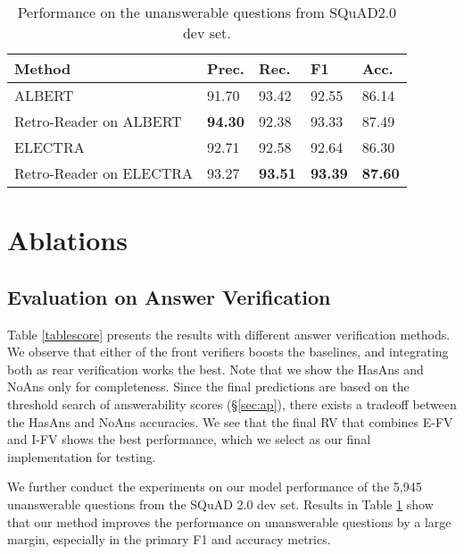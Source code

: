 \documentclass[letterpaper]{article} \usepackage{aaai21}  \usepackage{times}  \usepackage{helvet} \usepackage{courier}  \usepackage[hyphens]{url}  \usepackage{graphicx}
\begin{document}
\begin{table}
	\begin{center}
\setlength{\tabcolsep}{3.5pt}
		{
			\begin{tabular}{lllll}
				\toprule
				\textbf{Method}	& \textbf{Prec.} & \textbf{Rec.} 	& \textbf{F1} & \textbf{Acc.} \\
				\midrule
				ALBERT & 91.70 & 93.42 & 92.55 & 86.14  \\
				Retro-Reader on ALBERT & \textbf{94.30} & 92.38 & 93.33 & 87.49 \\
                ELECTRA & 92.71 & 92.58 & 92.64 & 86.30 \\
                Retro-Reader on ELECTRA & 93.27 & \textbf{93.51} & \textbf{93.39} & \textbf{87.60} \\
				\bottomrule
			\end{tabular}
		}
	\end{center}
	\caption{\label{tab:unans} Performance on the unanswerable questions from SQuAD2.0 dev set.}
\end{table}

\section{Ablations}

\subsection{Evaluation on Answer Verification}
Table \ref{tablescore} presents the results with different answer verification methods. We observe that either of the front verifiers boosts the baselines, and integrating both as rear verification works the best. Note that we show the HasAns and NoAns only for completeness. Since the final predictions are based on the threshold search of answerability scores (\S\ref{sec:ap}), there exists a tradeoff between the HasAns and NoAns accuracies. We see that the final RV that combines E-FV and I-FV shows the best performance, which we select as our final implementation for testing.


We further conduct the experiments on our model performance of the 5,945 unanswerable questions from the SQuAD 2.0 dev set. Results in Table \ref{tab:unans} show that our method improves the performance on unanswerable questions by a large margin, especially in the primary F1 and accuracy metrics.
\end{document}
